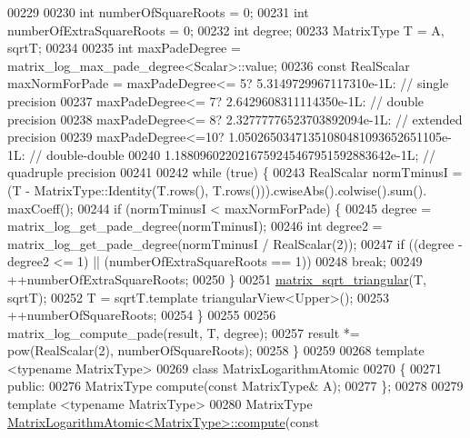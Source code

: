 \begin{DoxyCode}
00229 
00230   \textcolor{keywordtype}{int} numberOfSquareRoots = 0;
00231   \textcolor{keywordtype}{int} numberOfExtraSquareRoots = 0;
00232   \textcolor{keywordtype}{int} degree;
00233   MatrixType T = A, sqrtT;
00234 
00235   \textcolor{keywordtype}{int} maxPadeDegree = matrix\_log\_max\_pade\_degree<Scalar>::value;
00236   \textcolor{keyword}{const} RealScalar maxNormForPade = maxPadeDegree<= 5? 5.3149729967117310e-1L:                    \textcolor{comment}{// single
       precision}
00237                                     maxPadeDegree<= 7? 2.6429608311114350e-1L:                    \textcolor{comment}{// double
       precision}
00238                                     maxPadeDegree<= 8? 2.32777776523703892094e-1L:                \textcolor{comment}{//
       extended precision}
00239                                     maxPadeDegree<=10? 1.05026503471351080481093652651105e-1L:    \textcolor{comment}{//
       double-double}
00240                                                        1.1880960220216759245467951592883642e-1L;  \textcolor{comment}{//
       quadruple precision}
00241 
00242   \textcolor{keywordflow}{while} (\textcolor{keyword}{true}) \{
00243     RealScalar normTminusI = (T - MatrixType::Identity(T.rows(), T.rows())).cwiseAbs().colwise().sum().
      maxCoeff();
00244     \textcolor{keywordflow}{if} (normTminusI < maxNormForPade) \{
00245       degree = matrix\_log\_get\_pade\_degree(normTminusI);
00246       \textcolor{keywordtype}{int} degree2 = matrix\_log\_get\_pade\_degree(normTminusI / RealScalar(2));
00247       \textcolor{keywordflow}{if} ((degree - degree2 <= 1) || (numberOfExtraSquareRoots == 1)) 
00248         \textcolor{keywordflow}{break};
00249       ++numberOfExtraSquareRoots;
00250     \}
00251     \hyperlink{namespace_eigen_ae51c91f920f6ea4a7f6f72caa1e8249f}{matrix\_sqrt\_triangular}(T, sqrtT);
00252     T = sqrtT.template triangularView<Upper>();
00253     ++numberOfSquareRoots;
00254   \}
00255 
00256   matrix\_log\_compute\_pade(result, T, degree);
00257   result *= pow(RealScalar(2), numberOfSquareRoots);
00258 \}
00259 
00268 \textcolor{keyword}{template} <\textcolor{keyword}{typename} MatrixType>
00269 \textcolor{keyword}{class }MatrixLogarithmAtomic
00270 \{
00271 \textcolor{keyword}{public}:
00276   MatrixType compute(\textcolor{keyword}{const} MatrixType& A);
00277 \};
00278 
00279 \textcolor{keyword}{template} <\textcolor{keyword}{typename} MatrixType>
00280 MatrixType \hyperlink{class_eigen_1_1internal_1_1_matrix_logarithm_atomic_a14d76ac8fb2bc662a9560a76f7df4fe7}{MatrixLogarithmAtomic<MatrixType>::compute}(\textcolor{keyword}{const} 

\end{DoxyCode}
